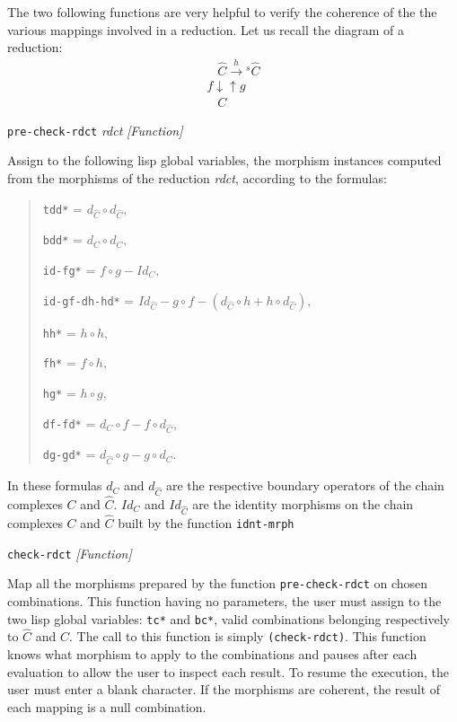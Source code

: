 The two following functions are very helpful to verify the coherence of the 
the various mappings involved in a reduction. Let us recall the diagram
of a reduction:
$$
\begin{array}{l}
\hspace{10pt} \hat{C} \stackrel{h}{\longrightarrow}\mbox{$^s\hat{C}$} \\
{\scriptstyle f} \downarrow \uparrow {\scriptstyle g}\\
\hspace{10pt} C
\end{array}
$$
\newpage
{\parindent=0mm
{\leftskip=5mm 
{\tt pre-check-rdct} {\em rdct} \hfill {\em [Function]} \par}
{\leftskip=15mm 
Assign to the following lisp global variables, the morphism instances computed
from the morphisms of the reduction {\em rdct}, according to the  formulas:\par}
{\leftskip 20mm
\begin{quotation}
  {\tt *tdd*}  = $ d_{\hat C} \circ d_{\hat C},$

  {\tt *bdd*}  = $ d_C \circ d_C ,$

  {\tt *id-fg*}  = $  f \circ g - Id_C,$

  {\tt *id-gf-dh-hd*}  = $ Id_{\hat C} - g \circ f - (d_{\hat C} \circ h + h \circ d_{\hat C}),$

  {\tt *hh*}  = $ h \circ h,$

  {\tt *fh*}  = $ f \circ h,$

  {\tt *hg*}  = $ h \circ g,$

  {\tt *df-fd*}  = $  d_C \circ f - f \circ d_{\hat C},$

  {\tt *dg-gd*}  = $  d_{\hat C} \circ g - g \circ d_C.$

\end{quotation} \par}
{\leftskip=15mm
In these formulas  $d_C$ and $d_{\hat C}$ are the respective boundary operators of the
chain complexes $C$ and $\hat C$. $Id_C$ and $Id_{\hat C}$ are the identity morphisms
on the chain complexes $C$ and $\hat C$  built by the function {\tt idnt-mrph} \par}
{\leftskip=5mm 
{\tt check-rdct} \hfill {\em [Function]} \par}
{\leftskip=15mm 
Map  all the morphisms prepared by the function {\tt pre-check-rdct} on chosen combinations.
This function having no parameters, the user must  assign  
to  the two lisp global variables:
{\tt *tc*} and {\tt *bc*},  valid combinations belonging respectively to $\hat C$ and $C$. 
The call to this
function is simply {\tt (check-rdct)}. This function knows what morphism to apply
to the combinations and pauses after each evaluation to allow the user to inspect each result.
To resume the execution, the user must enter a blank character.
If the morphisms are coherent, the result of each mapping is a null combination. \par}
}
\newpage

